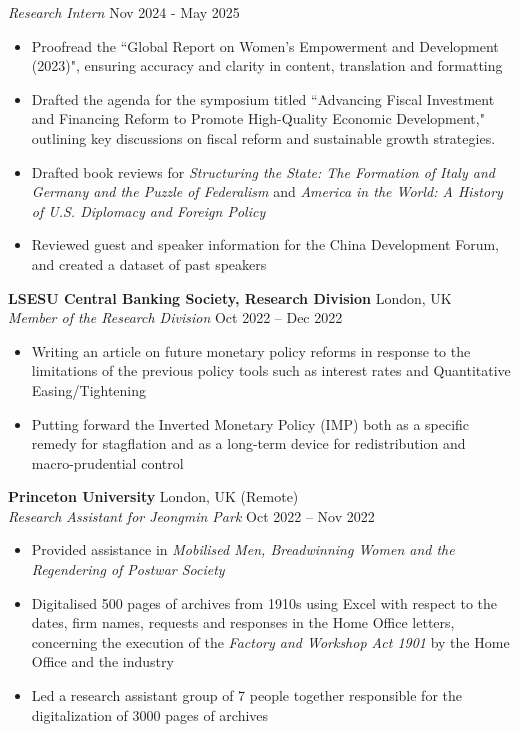 \documentclass[a4paper,9pt]{extarticle}
\begin{document}
\textit{Research Intern} \hfill Nov 2024 - May 2025
\begin{itemize}
    \item Proofread the ``Global Report on Women's Empowerment and Development (2023)", ensuring accuracy and clarity in content, translation and formatting
    \item Drafted the agenda for the symposium titled ``Advancing Fiscal Investment and Financing Reform to Promote High-Quality Economic Development," outlining key discussions on fiscal reform and sustainable growth strategies.
    \item Drafted book reviews for \textit{Structuring the State: The Formation of Italy and Germany and the Puzzle of Federalism} and \textit{America in the World: A History of U.S. Diplomacy and Foreign Policy}
    \item Reviewed guest and speaker information for the China Development Forum, and created a dataset of past speakers
\end{itemize}
\noindent
\textbf{LSESU Central Banking Society, Research Division} \hfill London, UK\\ %
\textit{Member of the Research Division} \hfill Oct 2022 – Dec 2022 %
\begin{itemize}
    \item Writing an article on future monetary policy reforms in response to the limitations of the previous policy tools such as interest rates and Quantitative Easing/Tightening
    \item Putting forward the Inverted Monetary Policy (IMP) both as a specific remedy for stagflation and as a long-term device  for redistribution and macro-prudential control
\end{itemize}
\noindent
\textbf{Princeton University} \hfill London, UK (Remote) \\
\textit{Research Assistant for Jeongmin Park} \hfill Oct 2022 – Nov 2022 %
\begin{itemize}
    \item Provided assistance in \textit{Mobilised Men, Breadwinning Women and the Regendering of Postwar Society}
    \item Digitalised 500 pages of archives from 1910s using Excel with respect to the dates, firm names, requests and responses in the Home Office letters, concerning the execution of the \textit{Factory and Workshop Act 1901} by the Home Office and the industry
    \item Led a research assistant group of 7 people together responsible for the digitalization of 3000 pages of archives
\end{itemize}
\end{document}
